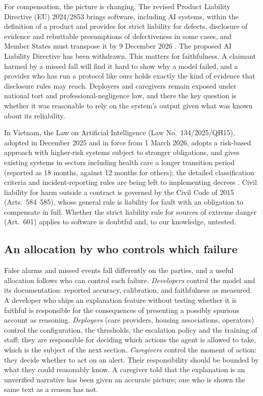 \documentclass[11pt,a4paper]{article}
\begin{document}
For compensation, the picture is changing. The revised Product Liability Directive (EU) 2024/2853 brings software, including AI systems, within the definition of a product and provides for strict liability for defects, disclosure of evidence and rebuttable presumptions of defectiveness in some cases, and Member States must transpose it by 9 December 2026 \cite{pld}. The proposed AI Liability Directive has been withdrawn. This matters for faithfulness. A claimant harmed by a missed fall will find it hard to show why a model failed, and a provider who has run a protocol like ours holds exactly the kind of evidence that disclosure rules may reach. Deployers and caregivers remain exposed under national tort and professional-negligence law, and there the key question is whether it was reasonable to rely on the system's output given what was known about its reliability.

In Vietnam, the Law on Artificial Intelligence (Law No.~134/2025/QH15), adopted in December 2025 and in force from 1 March 2026, adopts a risk-based approach with higher-risk systems subject to stronger obligations, and gives existing systems in sectors including health care a longer transition period (reported as 18 months, against 12 months for others); the detailed classification criteria and incident-reporting rules are being left to implementing decrees \cite{vn_ailaw}. Civil liability for harm outside a contract is governed by the Civil Code of 2015 (Arts.~584--585), whose general rule is liability for fault with an obligation to compensate in full. Whether the strict liability rule for sources of extreme danger (Art.~601) applies to software is doubtful and, to our knowledge, untested.

\subsection{An allocation by who controls which failure}
False alarms and missed events fall differently on the parties, and a useful allocation follows who can control each failure. \emph{Developers} control the model and its documentation: reported accuracy, calibration, and faithfulness as measured. A developer who ships an explanation feature without testing whether it is faithful is responsible for the consequences of presenting a possibly spurious account as reasoning. \emph{Deployers} (care providers, housing associations, operators) control the configuration, the thresholds, the escalation policy and the training of staff; they are responsible for deciding which actions the agent is allowed to take, which is the subject of the next section. \emph{Caregivers} control the moment of action: they decide whether to act on an alert. Their responsibility should be bounded by what they could reasonably know. A caregiver told that the explanation is an unverified narrative has been given an accurate picture; one who is shown the same text as a reason has not.
\end{document}
